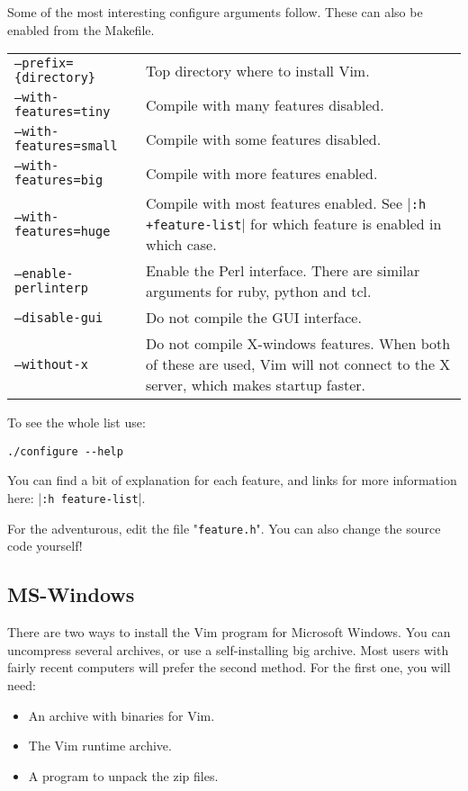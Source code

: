 Some of the most interesting configure arguments follow.
These can also be enabled from the Makefile.

\begin{center} \begin{tabularx}{\textwidth}{l X}
				\texttt{--prefix=\{directory\}} & Top directory where to install Vim. \\
				\texttt{--with-features=tiny} & Compile with many features disabled. \\
				\texttt{--with-features=small} & Compile with some features disabled. \\
				\texttt{--with-features=big} & Compile with more features enabled. \\
				\texttt{--with-features=huge} & Compile with most features enabled.  See |\texttt{:h +feature-list}| for which feature is enabled in which case. \\
				\texttt{--enable-perlinterp} & Enable the Perl interface.  There are similar arguments for ruby, python and tcl. \\
				\texttt{--disable-gui} & Do not compile the GUI interface. \\
				\texttt{--without-x} & Do not compile X-windows features.  When both of these are used, Vim will not connect to the X server, which makes startup faster. \\
\end{tabularx} \end{center}

To see the whole list use:

\begin{Verbatim}[samepage=true]
 ./configure --help
\end{Verbatim}

You can find a bit of explanation for each feature, and links for more information here: |\texttt{:h feature-list}|.

For the adventurous, edit the file "\texttt{feature.h}".
You can also change the source code yourself!
\subsection{MS-Windows}
There are two ways to install the Vim program for Microsoft Windows.
You can uncompress several archives, or use a self-installing big archive.
Most users with fairly recent computers will prefer the second method.
For the first one, you will need:

\begin{itemize}
    \item An archive with binaries for Vim.
    \item The Vim runtime archive.
    \item A program to unpack the zip files.
\end{itemize}

